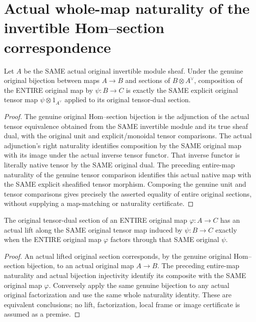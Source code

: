 \section{Actual whole-map naturality of the invertible Hom--section correspondence}

\begin{theorem}\label{sc0-hom-section-naturality:composition}
\leanok
{}
Let $A$ be the SAME actual original invertible module sheaf. Under the genuine original bijection between maps $A\to B$ and sections of $B\otimes A^\vee$, composition of the ENTIRE original map by $\psi:B\to C$ is exactly the SAME explicit original tensor map $\psi\otimes1_{A^\vee}$ applied to its original tensor-dual section.
\end{theorem}
\begin{proof}
The genuine original Hom--section bijection is the adjunction of the actual tensor equivalence obtained from the SAME invertible module and its true sheaf dual, with the original unit and explicit/monoidal tensor comparisons. The actual adjunction's right naturality identifies composition by the SAME original map with its image under the actual inverse tensor functor. That inverse functor is literally native tensor by the SAME original dual. The preceding entire-map naturality of the genuine tensor comparison identifies this actual native map with the SAME explicit sheafified tensor morphism. Composing the genuine unit and tensor comparisons gives precisely the asserted equality of entire original sections, without supplying a map-matching or naturality certificate.
\end{proof}

\begin{theorem}\label{sc0-hom-section-naturality:lift-factorization}
\leanok
{}
The original tensor-dual section of an ENTIRE original map $\varphi:A\to C$ has an actual lift along the SAME original tensor map induced by $\psi:B\to C$ exactly when the ENTIRE original map $\varphi$ factors through that SAME original $\psi$.
\end{theorem}
\begin{proof}
An actual lifted original section corresponds, by the genuine original Hom--section bijection, to an actual original map $A\to B$. The preceding entire-map naturality and actual bijection injectivity identify its composite with the SAME original map $\varphi$. Conversely apply the same genuine bijection to any actual original factorization and use the same whole naturality identity. These are equivalent conclusions; no lift, factorization, local frame or image certificate is assumed as a premise.
\end{proof}
